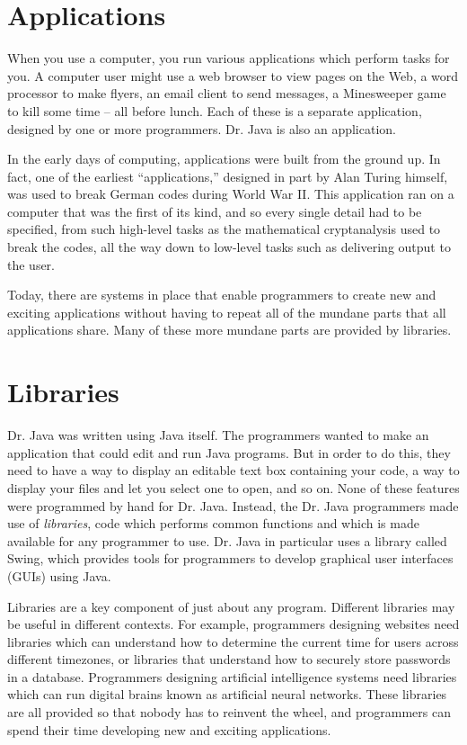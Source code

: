 \section{Applications}

When you use a computer, you run various applications which perform tasks for you. A computer user might use a web browser to view pages on the Web, a word processor to make flyers, an email client to send messages, a Minesweeper game to kill some time -- all before lunch. Each of these is a separate application, designed by one or more programmers. Dr. Java is also an application.

In the early days of computing, applications were built from the ground up. In fact, one of the earliest ``applications,'' designed in part by Alan Turing himself, was used to break German codes during World War II. This application ran on a computer that was the first of its kind, and so every single detail had to be specified, from such high-level tasks as the mathematical cryptanalysis used to break the codes, all the way down to low-level tasks such as delivering output to the user.

Today, there are systems in place that enable programmers to create new and exciting applications without having to repeat all of the mundane parts that all applications share. Many of these more mundane parts are provided by libraries.

\section{Libraries}

Dr. Java was written using Java itself. The programmers wanted to make an application that could edit and run Java programs. But in order to do this, they need to have a way to display an editable text box containing your code, a way to display your files and let you select one to open, and so on. None of these features were programmed by hand for Dr. Java. Instead, the Dr. Java programmers made use of \emph{libraries}, code which performs common functions and which is made available for any programmer to use. Dr. Java in particular uses a library called Swing, which provides tools for programmers to develop graphical user interfaces (GUIs) using Java.

Libraries are a key component of just about any program. Different libraries may be useful in different contexts. For example, programmers designing websites need libraries which can understand how to determine the current time for users across different timezones, or libraries that understand how to securely store passwords in a database. Programmers designing artificial intelligence systems need libraries which can run digital brains known as artificial neural networks. These libraries are all provided so that nobody has to reinvent the wheel, and programmers can spend their time developing new and exciting applications.


